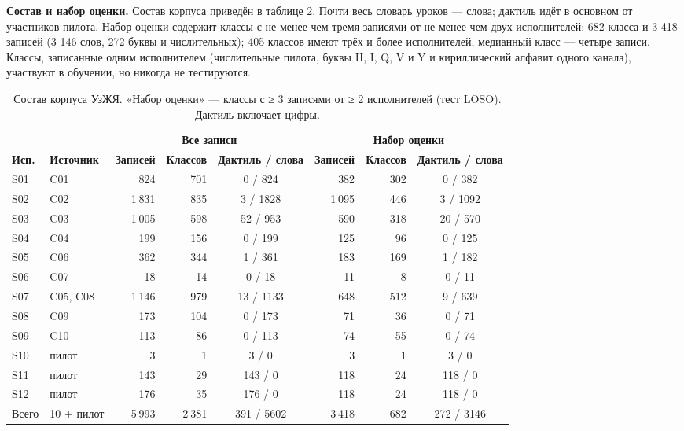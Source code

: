 \textbf{Состав и набор оценки.} Состав корпуса приведён в таблице 2. Почти весь словарь уроков --- слова; дактиль идёт в основном от участников пилота. Набор оценки содержит классы с не менее чем тремя записями от не менее чем двух исполнителей: 682 класса и 3 418 записей (3 146 слов, 272 буквы и числительных); 405 классов имеют трёх и более исполнителей, медианный класс --- четыре записи. Классы, записанные одним исполнителем (числительные пилота, буквы H, I, Q, V и Y и кириллический алфавит одного канала), участвуют в обучении, но никогда не тестируются.

\begin{table}[t]
\caption{Состав корпуса УзЖЯ. «Набор оценки» — классы с ≥ 3 записями от ≥ 2 исполнителей (тест LOSO). Дактиль включает цифры.}\label{tab:corpus}
\footnotesize\setlength{\tabcolsep}{4pt}
\centering
\begin{tabular}{llrrcrrc}
\toprule
& & \multicolumn{3}{c}{\textbf{Все записи}} & \multicolumn{3}{c}{\textbf{Набор оценки}} \\ \cmidrule(lr){3-5}\cmidrule(lr){6-8}
\textbf{Исп.} & \textbf{Источник} & \textbf{Записей} & \textbf{Классов} & \textbf{Дактиль / слова} & \textbf{Записей} & \textbf{Классов} & \textbf{Дактиль / слова} \\
\midrule
S01 & C01 & 824 & 701 & 0 / 824 & 382 & 302 & 0 / 382 \\
S02 & C02 & 1 831 & 835 & 3 / 1828 & 1 095 & 446 & 3 / 1092 \\
S03 & C03 & 1 005 & 598 & 52 / 953 & 590 & 318 & 20 / 570 \\
S04 & C04 & 199 & 156 & 0 / 199 & 125 & 96 & 0 / 125 \\
S05 & C06 & 362 & 344 & 1 / 361 & 183 & 169 & 1 / 182 \\
S06 & C07 & 18 & 14 & 0 / 18 & 11 & 8 & 0 / 11 \\
S07 & C05, C08 & 1 146 & 979 & 13 / 1133 & 648 & 512 & 9 / 639 \\
S08 & C09 & 173 & 104 & 0 / 173 & 71 & 36 & 0 / 71 \\
S09 & C10 & 113 & 86 & 0 / 113 & 74 & 55 & 0 / 74 \\
S10 & пилот & 3 & 1 & 3 / 0 & 3 & 1 & 3 / 0 \\
S11 & пилот & 143 & 29 & 143 / 0 & 118 & 24 & 118 / 0 \\
S12 & пилот & 176 & 35 & 176 / 0 & 118 & 24 & 118 / 0 \\
Всего & 10 + пилот & 5 993 & 2 381 & 391 / 5602 & 3 418 & 682 & 272 / 3146 \\
\bottomrule
\end{tabular}
\end{table}

